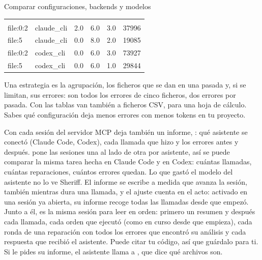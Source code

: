 \documentclass[11pt,a4paper]{article}
\begin{document}
\begin{play}{Comparar configuraciones, backends y modelos}
\begin{center}
\begin{tabularx}{0.95\linewidth}{@{\hspace{6pt}}>{\ttfamily}p{16mm}>{\ttfamily}p{18mm}LLLL}
\headrow {} &  &  &  &  &  \\
file:0:2 & claude\_cli & 2.0 & 6.0 & 3.0 & 37996 \\
file:5 & claude\_cli & 0.0 & 8.0 & 2.0 & 19085 \\
file:0:2 & codex\_cli & 0.0 & 6.0 & 3.0 & 73927 \\
file:5 & codex\_cli & 0.0 & 6.0 & 1.0 & 29844 \\
\end{tabularx}
\end{center}
Una estrategia es la agrupación, los ficheros que se dan en una pasada y, si
se limitan, sus errores:  son todos los errores de cinco
ficheros,  dos errores por pasada. Con  las
tablas van también a ficheros CSV, para una hoja de cálculo.
\done Sabes qué configuración deja menos errores con menos tokens en tu
proyecto.
\end{play}

\begin{note}
Con  cada sesión del servidor MCP deja también un
informe, : qué asistente se conectó
(Claude Code, Codex), cada llamada que hizo y los errores antes y después.
 pone las sesiones una al lado de otra por asistente,
así se puede comparar la misma tarea hecha en Claude Code y en Codex: cuántas
llamadas, cuántas reparaciones, cuántos errores quedan. Lo que gastó el modelo
del asistente no lo ve Sheriff. El informe se escribe a medida que avanza la
sesión, también mientras dura una llamada, y el ajuste cuenta en el acto:
activado en una sesión ya abierta, su informe recoge todas las llamadas desde
que empezó. Junto a él,  es la misma
sesión para leer en orden: primero un resumen y después cada llamada, cada
orden que ejecutó (como en curso desde que empieza), cada ronda de una reparación con todos los errores que
encontró su análisis y cada respuesta que recibió el asistente. Puede citar tu
código, así que guárdalo para ti. Si le pides su informe, el asistente llama a
, que dice qué archivos son.
\end{note}
\end{document}
